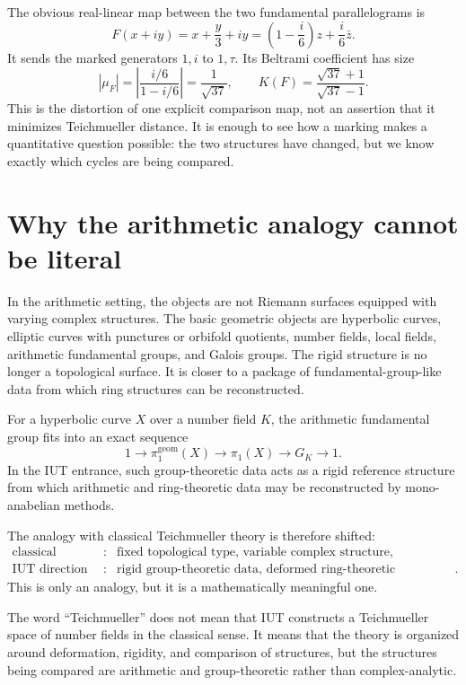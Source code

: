 The obvious real-linear map between the two fundamental parallelograms is
\[
 F(x+iy)=x+\frac y3+iy
       =\left(1-\frac i6\right)z+\frac i6\bar z.
\]
It sends the marked generators $1,i$ to $1,\tau$. Its Beltrami coefficient has size
\[
 |\mu_F|
 =\left|\frac{i/6}{1-i/6}\right|
 =\frac1{\sqrt{37}},
 \qquad
 K(F)=\frac{\sqrt{37}+1}{\sqrt{37}-1}.
\]
This is the distortion of one explicit comparison map, not an assertion that it minimizes Teichmueller distance. It is enough to see how a marking makes a quantitative question possible: the two structures have changed, but we know exactly which cycles are being compared.

\section{Why the arithmetic analogy cannot be literal}

In the arithmetic setting, the objects are not Riemann surfaces equipped with varying complex structures.  The basic geometric objects are hyperbolic curves, elliptic curves with punctures or orbifold quotients, number fields, local fields, arithmetic fundamental groups, and Galois groups.  The rigid structure is no longer a topological surface.  It is closer to a package of fundamental-group-like data from which ring structures can be reconstructed.

\begin{definition}
For a hyperbolic curve \(X\) over a number field \(K\), the arithmetic fundamental group fits into an exact sequence
\[
  1\longrightarrow \pi_1^{\mathrm{geom}}(X)
  \longrightarrow \pi_1(X)
  \longrightarrow G_K
  \longrightarrow 1.
\]
In the IUT entrance, such group-theoretic data acts as a rigid reference structure from which arithmetic and ring-theoretic data may be reconstructed by mono-anabelian methods.
\end{definition}

The analogy with classical Teichmueller theory is therefore shifted:
\[
\begin{array}{ccl}
\text{classical theory} &:&
\text{fixed topological type, variable complex structure},\\[2mm]
\text{IUT direction} &:&
\text{rigid group-theoretic data, deformed ring-theoretic presentations}.
\end{array}
\]
This is only an analogy, but it is a mathematically meaningful one.

\begin{remark}
The word ``Teichmueller'' does not mean that IUT constructs a Teichmueller space of number fields in the classical sense.  It means that the theory is organized around deformation, rigidity, and comparison of structures, but the structures being compared are arithmetic and group-theoretic rather than complex-analytic.
\end{remark}

